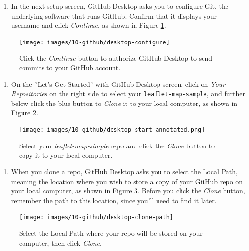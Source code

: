 \documentclass[
  english,
]{book}
\providecommand{\tightlist}{%
  \setlength{\itemsep}{0pt}\setlength{\parskip}{0pt}}
\begin{document}
\begin{enumerate}
\def\labelenumi{\arabic{enumi}.}
\setcounter{enumi}{2}
\tightlist
\item
  In the next setup screen, GitHub Desktop asks you to configure Git, the underlying software that runs GitHub. Confirm that it displays your username and click \emph{Continue}, as shown in Figure \ref{fig:desktop-configure}.
\end{enumerate}



\begin{figure}
\texttt{[image: images/10-github/desktop-configure]} \caption{Click the \emph{Continue} button to authorize GitHub Desktop to send commits to your GitHub account.}\label{fig:desktop-configure}
\end{figure}

\begin{enumerate}
\def\labelenumi{\arabic{enumi}.}
\setcounter{enumi}{3}
\tightlist
\item
  On the ``Let's Get Started'' with GitHub Desktop screen, click on \emph{Your Repositories} on the right side to select your \texttt{leaflet-map-sample}, and further below click the blue button to \emph{Clone} it to your local computer, as shown in Figure \ref{fig:desktop-start}.
\end{enumerate}



\begin{figure}
\centering
\texttt{[image: images/10-github/desktop-start-annotated.png]}
\caption{\label{fig:desktop-start}Select your \emph{leaflet-map-simple} repo and click the \emph{Clone} button to copy it to your local computer.}
\end{figure}

\begin{enumerate}
\def\labelenumi{\arabic{enumi}.}
\setcounter{enumi}{4}
\tightlist
\item
  When you clone a repo, GitHub Desktop asks you to select the Local Path, meaning the location where you wish to store a copy of your GitHub repo on your local computer, as shown in Figure \ref{fig:desktop-clone-path}. Before you click the \emph{Clone} button, remember the path to this location, since you'll need to find it later.
\end{enumerate}



\begin{figure}
\texttt{[image: images/10-github/desktop-clone-path]} \caption{Select the Local Path where your repo will be stored on your computer, then click \emph{Clone}.}\label{fig:desktop-clone-path}
\end{figure}
\end{document}
